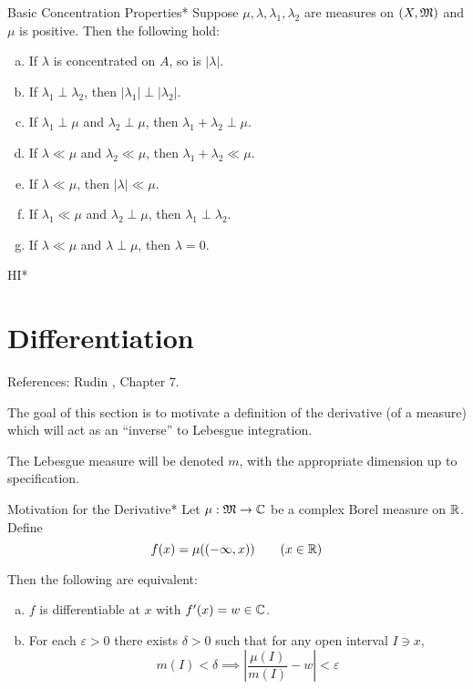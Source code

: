 \begin{proposition}{Basic Concentration Properties}*
    Suppose $\mu, \lambda, \lambda_1, \lambda_2$ are measures on $(X, \mathfrak{M})$ and $\mu$ is positive. Then the following hold:
    \begin{enumerate}[(a)]
        \itemsep0em
        \item If $\lambda$ is concentrated on $A$, so is $|\lambda|$. 
        \item If $\lambda_1 \perp \lambda_2$, then $|\lambda_1| \perp |\lambda_2|$. 
        \item If $\lambda_1 \perp \mu$ and $\lambda_2 \perp \mu$, then $\lambda_1 + \lambda_2 \perp \mu$.
        \item If $\lambda \ll \mu$ and $\lambda_2 \ll \mu$, then $\lambda_1 + \lambda_2 \ll \mu$.
        \item If $\lambda \ll \mu$, then $|\lambda| \ll \mu$.
        \item If $\lambda_1 \ll \mu$ and $\lambda_2 \perp \mu$, then $\lambda_1 \perp \lambda_2$. 
        \item If $\lambda \ll \mu$ and $\lambda \perp \mu$, then $\lambda = 0$. 
    \end{enumerate}
\end{proposition}

\begin{remark}{HI}*
\end{remark}









\newpage
\section{Differentiation}

References: Rudin , Chapter 7. 
\stdvspace

 The goal of this section is to motivate a definition of the derivative (of a measure) which will act as an ``inverse'' to Lebesgue integration.
\stdvspace

 The Lebesgue measure will be denoted $m$, with the appropriate dimension up to specification. 

\begin{theorem}{Motivation for the Derivative}*
    Let $\mu : \mathfrak{M} \to \mathbb{C}$ be a complex Borel measure on $\mathbb{R}$. Define 
    $$
        f(x) = \mu((-\infty, x)) 
        \qquad (x \in \mathbb{R})
    $$

    Then the following are equivalent: 
    \begin{enumerate}[(a)]
        \item $f$ is differentiable at $x$ with $f'(x) = w \in \mathbb{C}$. 
        \item For each $\varepsilon > 0$ there exists $\delta > 0$ such that for any open interval $I \ni x$, 
        $$
            m(I) < \delta 
            \implies
            \left| \frac{\mu(I)}{m(I)} - w \right| < \varepsilon
        $$
    \end{enumerate}
\end{theorem}

